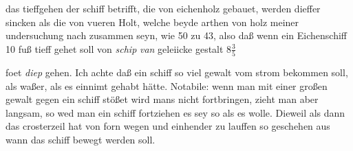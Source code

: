 \pend 
\pstart {} das tieffgehen der schiff\protect{} betrifft, die von eichenholz\protect{} gebauet, werden dieffer sincken als die von vueren Holt\protect{}, welche beyde arthen von holz\protect{} meiner undersuchung nach zusammen seyn, wie 50 zu 43, also daß wenn ein Eichenschiff\protect{} 10 fuß tieff gehet soll von  \textit{schip}\protect{} \textit{van} geleiicke gestalt 8$\displaystyle\frac{3}{5}$\rule[-4mm]{0mm}{10mm} foet \textit{diep} gehen.
\pend 
\pstart Ich achte daß ein schiff\protect{} so viel gewalt vom strom bekommen soll, als  waßer, als es einnimt gehabt h\"{a}tte.
\pend 
\pstart Notabile: wenn man mit einer großen gewalt gegen ein  schiff\protect{} st\"{o}ßet wird mans nicht fortbringen, zieht man aber langsam, so wed man ein schiff\protect{} fortziehen es sey so  als es wolle. Dieweil als dann das crosterzeil\protect{} hat von forn wegen und einhender zu lauffen so geschehen aus wann das schiff\protect{} bewegt werden soll.
\pend 
